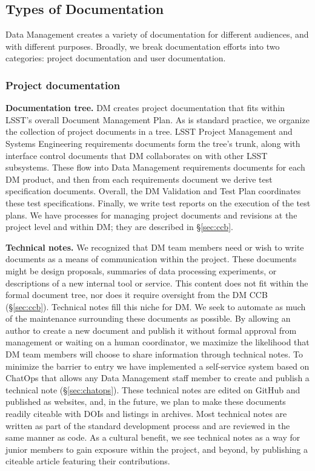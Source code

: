 \subsection{Types of Documentation}
\label{sec:doc_types}

Data Management creates a variety of documentation for different audiences, and with different purposes.
Broadly, we break documentation efforts into two categories: project documentation and user documentation.

\subsubsection{Project documentation}
\label{sec:project_docs}

\noindent \textbf{Documentation tree.}
DM creates project documentation that fits within LSST's overall Document Management Plan.\cite{LPM-51}
As is standard practice, we organize the collection of project documents in a tree\cite{LDM-294}.
LSST Project Management and Systems Engineering requirements documents form the tree's trunk, along with interface control documents that DM collaborates on with other LSST subsystems.
These flow into Data Management requirements documents for each DM product, and then from each requirements document we derive test specification documents.
Overall, the DM Validation and Test Plan\cite{LDM-503} coordinates these test specifications.
Finally, we write test reports on the execution of the test plans.
We have processes for managing project documents and revisions at the project level and within DM; they are described in \S\ref{sec:ccb}.

\noindent \textbf{Technical notes.}
We recognized that DM team members need or wish  to write documents as a means of communication within the project.
These documents might be design proposals, summaries of data processing experiments, or descriptions of a new internal tool or service.
This content does not fit within the formal document tree, nor does it require oversight from the DM CCB (\S\ref{sec:ccb}).
Technical notes fill this niche for DM.
We seek to automate as much of the maintenance surrounding these documents as possible.
By allowing an author to create a new document and publish it without formal approval from management or waiting on a human coordinator, we maximize the likelihood that DM team members will choose to share information through technical notes.
To minimize the barrier to entry we have implemented a self-service system based on ChatOps that allows any Data Management staff member to create and publish a technical note (\S\ref{sec:chatops}).
These technical notes are edited on GitHub and published as websites, and, in the future, we plan to make these documents readily citeable with DOIs and listings in archives.
Most technical notes are written as part of the standard development process and are reviewed in the same manner as code.
As a cultural benefit, we see technical notes as a way for junior members to gain exposure within the project, and beyond, by publishing a citeable article featuring their contributions.

